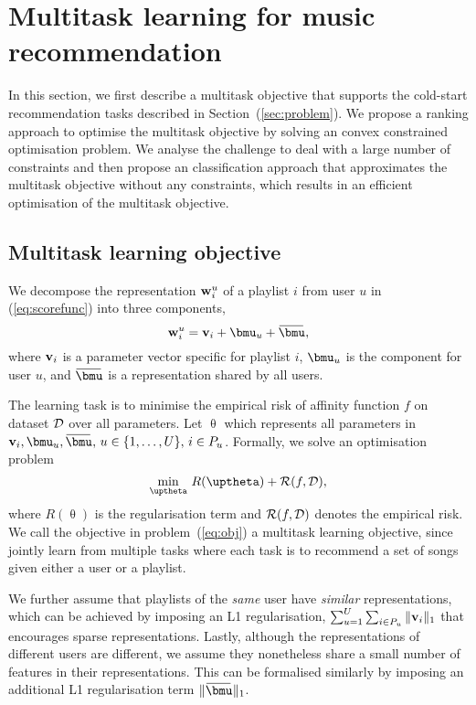 \section{Multitask learning for music recommendation}
\label{sec:method}

In this section, we first describe a multitask objective that supports the cold-start recommendation tasks
described in Section~(\ref{sec:problem}). We propose a ranking approach to optimise the multitask objective 
by solving an convex constrained optimisation problem.
We analyse the challenge to deal with a large number of constraints and then propose an classification approach
that approximates the multitask objective without any constraints, which results in an efficient optimisation of
the multitask objective.


\subsection{Multitask learning objective}

We decompose the representation $\mathbf{w}_i^u$ of a playlist $i$ from user $u$ in (\ref{eq:scorefunc}) into three components, \ie
$$
\w_i^u = \bv_i + \bmu_u + \widebar\bmu,
$$
where $\mathbf{v}_i$ is a parameter vector specific for playlist $i$,
$\bmu_u$ is the component for user $u$,
and $\widebar\bmu$ is a representation shared by all users.

The learning task is to minimise the empirical risk of affinity function $f$ on dataset $\mathcal{D}$ over all parameters.
Let $\uptheta$ which represents all parameters in $\bv_i, \bmu_u, \widebar\bmu, \, u \in \{1,\dots,U\}, \, i \in P_u$.
Formally, we solve an optimisation problem
\begin{equation}
\label{eq:obj}
\min_{\uptheta} \, R(\uptheta) + \RCal(f, \DCal),
\end{equation}
where $R(\uptheta)$ is the regularisation term and $\mathcal{R}(f, \mathcal{D})$ denotes the empirical risk.
We call the objective in problem~(\ref{eq:obj}) a multitask learning objective,
since jointly learn from multiple tasks where each task is to recommend a set of songs given either a user or a playlist.

We further assume that playlists of the \emph{same} user have \emph{similar} representations,
which can be achieved by imposing an L1 regularisation, \ie $\sum_{u=1}^U \sum_{i \in P_u} \| \mathbf{v}_i \|_1$
that encourages sparse representations.
Lastly, although the representations of different users are different,
we assume they nonetheless share a small number of features in their representations.
This can be formalised similarly by imposing an additional L1 regularisation term $\| \widebar\bmu \|_1$.

